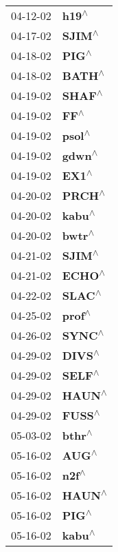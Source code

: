 \begin{supertabular}{p{0.08\textwidth}p{0.2\textwidth}}
 04-12-02 &     \textbf{h19\textsuperscript{$\wedge$}} \\
 04-17-02 &    \textbf{SJIM\textsuperscript{$\wedge$}} \\
 04-18-02 &     \textbf{PIG\textsuperscript{$\wedge$}} \\
 04-18-02 &    \textbf{BATH\textsuperscript{$\wedge$}} \\
 04-19-02 &    \textbf{SHAF\textsuperscript{$\wedge$}} \\
 04-19-02 &      \textbf{FF\textsuperscript{$\wedge$}} \\
 04-19-02 &    \textbf{psol\textsuperscript{$\wedge$}} \\
 04-19-02 &    \textbf{gdwn\textsuperscript{$\wedge$}} \\
 04-19-02 &     \textbf{EX1\textsuperscript{$\wedge$}} \\
 04-20-02 &    \textbf{PRCH\textsuperscript{$\wedge$}} \\
 04-20-02 &    \textbf{kabu\textsuperscript{$\wedge$}} \\
 04-20-02 &    \textbf{bwtr\textsuperscript{$\wedge$}} \\
 04-21-02 &    \textbf{SJIM\textsuperscript{$\wedge$}} \\
 04-21-02 &    \textbf{ECHO\textsuperscript{$\wedge$}} \\
 04-22-02 &    \textbf{SLAC\textsuperscript{$\wedge$}} \\
 04-25-02 &    \textbf{prof\textsuperscript{$\wedge$}} \\
 04-26-02 &    \textbf{SYNC\textsuperscript{$\wedge$}} \\
 04-29-02 &    \textbf{DIVS\textsuperscript{$\wedge$}} \\
 04-29-02 &    \textbf{SELF\textsuperscript{$\wedge$}} \\
 04-29-02 &    \textbf{HAUN\textsuperscript{$\wedge$}} \\
 04-29-02 &    \textbf{FUSS\textsuperscript{$\wedge$}} \\
 05-03-02 &    \textbf{bthr\textsuperscript{$\wedge$}} \\
 05-16-02 &     \textbf{AUG\textsuperscript{$\wedge$}} \\
 05-16-02 &     \textbf{n2f\textsuperscript{$\wedge$}} \\
 05-16-02 &    \textbf{HAUN\textsuperscript{$\wedge$}} \\
 05-16-02 &     \textbf{PIG\textsuperscript{$\wedge$}} \\
 05-16-02 &    \textbf{kabu\textsuperscript{$\wedge$}} \\

\end{supertabular}

